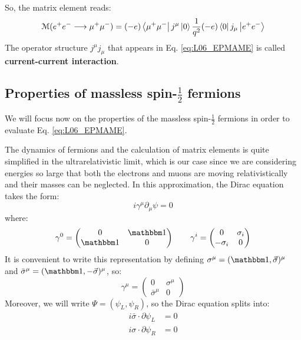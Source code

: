 \documentclass[../../main/main.tex]{subfiles}
\begin{document}
So, the matrix element reads:
\begin{equation}
	\mathcal{M}(e^+e^- \longrightarrow \mu^+\mu^-)
	=
	(-e) \bra{\mu^+\mu^-} j^{\mu} \ket{0}
	\frac{1}{q^2}
	(-e) \bra{0} j_{\mu} \ket{e^+e^-}
	\label{eq:L06_EPMAME}
\end{equation}
The operator structure \( j^\mu j_\mu \) that appears in Eq. \ref{eq:L06_EPMAME} is called \textbf{current-current interaction}.



\subsection{Properties of massless spin-\( \frac{1}{2} \) fermions}
We will focus now on the properties of the massless spin-\( \frac{1}{2} \) fermions in order to evaluate Eq. \ref{eq:L06_EPMAME}.

The dynamics of fermions and the calculation of matrix elements is quite simplified in the ultrarelativistic limit, which is our case since we are considering energies so large that both the electrons and muons are moving relativistically and their masses can be neglected. In this approximation, the Dirac equation takes the form:
\begin{equation}
	i \gamma^{\mu} \partial_{\mu} \psi
	=
	0
	\label{eq:}
\end{equation}
where:
\begin{equation}
	\gamma^0
	=
	\begin{pmatrix}
		0   & \id \\
		\id & 0
	\end{pmatrix}
	\qquad
	\gamma^i
	=
	\begin{pmatrix}
		0   & \sigma_i \\
		-\sigma_i & 0
	\end{pmatrix}
	\label{eq:}
\end{equation}
It is convenient to write this representation by defining \( \sigma^\mu = (\id, \va{\sigma})^\mu \) and \( \bar{\sigma}^\mu = (\id, - \va{\sigma})^\mu \), so:
\begin{equation}
	\gamma^\mu
	=
	\begin{pmatrix}
		0   & \sigma^\mu \\
		\bar{\sigma}^\mu   & 0
	\end{pmatrix}
	\label{eq:}
\end{equation}
Moreover, we will write \( \Psi = (\psi_L, \psi_R) \), so the Dirac equation splits into:
\begin{subequations}
	\begin{align}
		i\bar{\sigma} \cdot \partial{\psi_L} &= 0	\\
		i\sigma \cdot \partial{\psi_R} &= 0
	\end{align}
	\label{}
\end{subequations}
\end{document}
